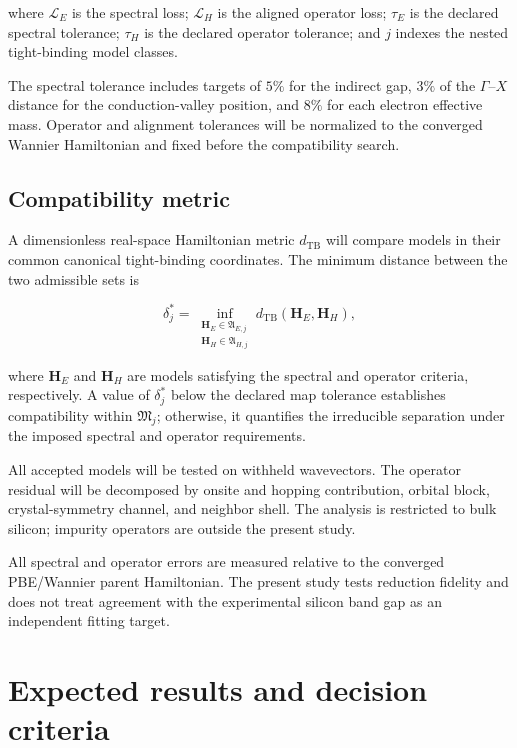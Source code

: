\documentclass[preprint,12pt]{elsarticle}
\begin{document}
where $\mathcal{L}_{E}$ is the spectral loss; $\mathcal{L}_{H}$ is the aligned
operator loss; $\tau_E$ is the declared spectral tolerance; $\tau_H$ is the
declared operator tolerance; and $j$ indexes the nested tight-binding model
classes.

The spectral tolerance includes targets of $5\%$ for the indirect gap, $3\%$
of the $\Gamma$--$X$ distance for the conduction-valley position, and $8\%$
for each electron effective mass. Operator and alignment tolerances will be
normalized to the converged Wannier Hamiltonian and fixed before the
compatibility search.

\subsection{Compatibility metric}
\label{sec:compatibility-metric}

A dimensionless real-space Hamiltonian metric $d_{\mathrm{TB}}$ will compare
models in their common canonical tight-binding coordinates. The minimum
distance between the two admissible sets is

\begin{equation}
\delta_{j}^{\ast}
=
\inf_{
\substack{
\bm{H}_{E}\in\mathfrak{A}_{E,j}\\
\bm{H}_{H}\in\mathfrak{A}_{H,j}
}
}
d_{\mathrm{TB}}(\bm{H}_{E},\bm{H}_{H}),
\label{eq:set-distance}
\end{equation}

where $\bm{H}_{E}$ and $\bm{H}_{H}$ are models satisfying the spectral and
operator criteria, respectively. A value of $\delta_{j}^{\ast}$ below the
declared map tolerance establishes compatibility within $\mathfrak{M}_{j}$;
otherwise, it quantifies the irreducible separation under the imposed spectral
and operator requirements.

All accepted models will be tested on withheld wavevectors. The operator
residual will be decomposed by onsite and hopping contribution, orbital block,
crystal-symmetry channel, and neighbor shell. The analysis is restricted to
bulk silicon; impurity operators are outside the present study.

All spectral and operator errors are measured relative to the converged
PBE/Wannier parent Hamiltonian. The present study tests reduction fidelity and
does not treat agreement with the experimental silicon band gap as an
independent fitting target.

\section{Expected results and decision criteria}
\label{sec:expected-results}
\end{document}
